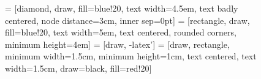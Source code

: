 \documentclass[journal, 12pt, onecolumn,draftclsnofoot]{IEEEtran}
\begin{document}
\begin{figure}
\begin{center}
 = [diamond, draw, fill=blue!20, 
    text width=4.5em, text badly centered, node distance=3cm, inner sep=0pt]
 = [rectangle, draw, fill=blue!20, 
    text width=5em, text centered, rounded corners, minimum height=4em]
 = [draw, -latex']
 = [draw, rectangle, minimum width=1.5cm, minimum height=1cm, text centered, text width=1.5cm, draw=black, fill=red!20]
    




\end{center}
\end{figure}
\end{document}
